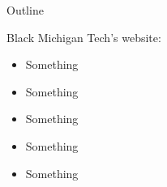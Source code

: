 \documentclass{MichiganTech}
\begin{document}
\maketitle

%
\nontitleslidesetup


%
\begin{frame}{Outline}
  \vspace*{0.10in}
  \begin{reference}{4mm}{84mm}{Black}
    Michigan Tech's website:
    \href{http://www.mtu.edu}{}
  \end{reference}

  \begin{itemize}
    \item Something
    \item Something
    \item Something
    \item Something
    \item Something
  \end{itemize}
\end{frame}
\end{document}
